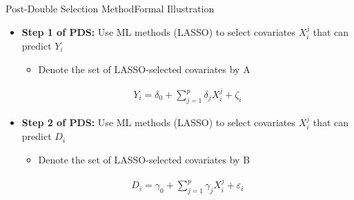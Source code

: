 \documentclass[dvipsnames,hyperref={pdfpagelabels=false}]{beamer}
\begin{document}
\begin{frame}{Post-Double Selection Method}{Formal Illustration}
	
	\begin{itemize}
	
		
		
		\item \textbf{Step 1 of PDS:} Use ML methods (LASSO) to select covariates $X^{j}_{i}$ that can predict $Y_{i}$
				\vspace{0.3cm}
				\begin{itemize}
		\item Denote the set of LASSO-selected covariates by A
			\end{itemize}
		\begin{eqnarray*}
			Y_{i} = \delta_{0} + \sum^{p}_{j=1} \delta_{j} X^{j}_{i}  + \zeta_{i}
		\end{eqnarray*}
		
		
		\vspace{0.3cm}
		\item \textbf{Step 2 of PDS:} Use ML methods (LASSO) to select covariates $X^{j}_{i}$ that can predict $D_{i}$ 
						\vspace{0.3cm}
							\begin{itemize}			
				\item Denote the set of LASSO-selected covariates by B
					\end{itemize}
		\begin{eqnarray*}
			D_{i} = \gamma_{0} +  \sum^{p}_{j=1} \gamma_{j} X^{j}_{i}  + \varepsilon_{i}
		\end{eqnarray*}
		
		
	\end{itemize}
	
\end{frame}
\end{document}

